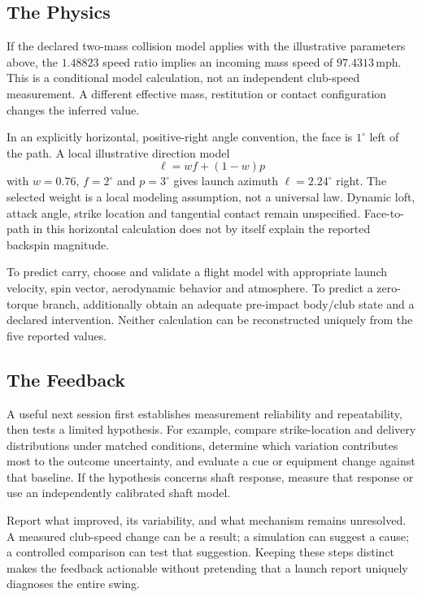 \subsection{The Physics}

If the declared two-mass collision model applies with the illustrative parameters above, the $1.48823$ speed ratio implies an incoming mass speed of $97.4313\,\mathrm{mph}$. This is a conditional model calculation, not an independent club-speed measurement. A different effective mass, restitution or contact configuration changes the inferred value.

In an explicitly horizontal, positive-right angle convention, the face is $1^\circ$ left of the path. A local illustrative direction model
\[
\ell=w f+(1-w)p
\]
with $w=0.76$, $f=2^\circ$ and $p=3^\circ$ gives launch azimuth $\ell=2.24^\circ$ right. The selected weight is a local modeling assumption, not a universal law. Dynamic loft, attack angle, strike location and tangential contact remain unspecified. Face-to-path in this horizontal calculation does not by itself explain the reported backspin magnitude.

To predict carry, choose and validate a flight model with appropriate launch velocity, spin vector, aerodynamic behavior and atmosphere. To predict a zero-torque branch, additionally obtain an adequate pre-impact body/club state and a declared intervention. Neither calculation can be reconstructed uniquely from the five reported values.

\subsection{The Feedback}

A useful next session first establishes measurement reliability and repeatability, then tests a limited hypothesis. For example, compare strike-location and delivery distributions under matched conditions, determine which variation contributes most to the outcome uncertainty, and evaluate a cue or equipment change against that baseline. If the hypothesis concerns shaft response, measure that response or use an independently calibrated shaft model.

Report what improved, its variability, and what mechanism remains unresolved. A measured club-speed change can be a result; a simulation can suggest a cause; a controlled comparison can test that suggestion. Keeping these steps distinct makes the feedback actionable without pretending that a launch report uniquely diagnoses the entire swing.

